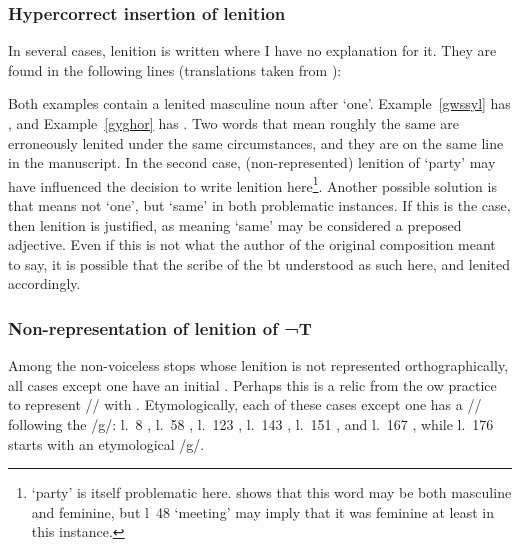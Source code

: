 \subsubsection{Hypercorrect insertion of lenition}
In several cases, lenition is written where I have no explanation for it. They are found in the following lines (translations taken from \textcite{williams_armes_1972}):

\begin{mwl}
\end{mwl}

Both examples contain a lenited masculine noun after  `one'. 
Example~\ref{gwssyl} has , and  Example~\ref{gyghor} has . 
Two words that mean roughly the same are erroneously lenited under the same circumstances, and they are on the same line in the manuscript. In the second case, (non-represented) lenition of  `party' may have influenced the decision to write lenition here\footnote{ `party' is itself problematic here. \Textcite[s.v.\ côr\textsuperscript{1}]{bevan_geiriadur_2014} shows that this word may be both masculine and feminine, but l~48 	`meeting' may imply that it was feminine at least in this instance.}. Another possible solution is that  means not `one', but `same' in both problematic instances. If this is the case, then lenition is justified, as  meaning `same' may be considered a preposed adjective. Even if this is not what the author of the original composition meant to say, it is possible that the scribe of the \gls{bt} understood  as such here, and lenited accordingly.



\subsubsection{Non-representation of lenition of ¬\acrshort{T}}
Among the non-voiceless stops whose lenition is not represented orthographically, all cases except one have an initial . Perhaps this is a relic from the \gls{ow} practice to represent /\cw/ with . Etymologically, each of these cases except one has a /\cw/ following the /g/: l.~8	,
l.~58	,
l.~123	,
l.~143	,
l.~151	, and
l.~167	, while
l.~176	 starts with an etymological /g/. 

